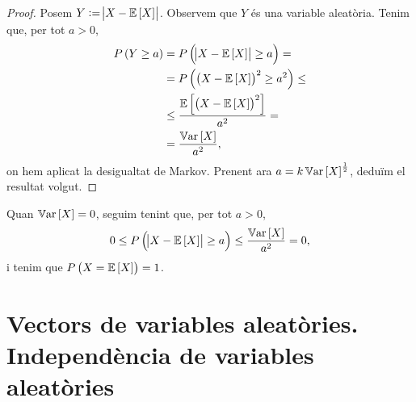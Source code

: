 \begin{proof}
    Posem $Y:=\abs{X-\operatorname{\mathbb{E}}\left[ X\right]}$. Observem que $Y$ és una variable aleatòria. Tenim que, per tot $a>0$,
    \begin{align*}
        P\left( Y\geq a\right) &= P\left(\abs{X-\operatorname{\mathbb{E}}\left[ X\right]}\geq a\right) = \\
        &= P\left(\left( X-\operatorname{\mathbb{E}}\left[ X\right]\right)^2\geq a^2\right) \leq\\
        &\leq \frac{\operatorname{\mathbb{E}}\left[ \left( X-\operatorname{\mathbb{E}}\left[ X\right]\right)^2\right]}{a^2} =\\
        &=\frac{\operatorname{\mathbb{V}ar}\left[ X\right]}{a^2},
    \end{align*}
    on hem aplicat la desigualtat de Markov. Prenent ara $a=k\operatorname{\mathbb{V}ar}\left[ X\right]^{\frac{1}{2}}$, deduïm el resultat volgut.
\end{proof}
\begin{obs}
    Quan $\operatorname{\mathbb{V}ar}\left[ X\right]=0$, seguim tenint que, per tot $a>0$,
    \[
        0\leq P\left(\abs{X-\operatorname{\mathbb{E}}\left[ X\right]} \geq a\right)\leq \frac{\operatorname{\mathbb{V}ar}\left[ X\right]}{a^2} =0,
    \]
    i tenim que $P\left( X=\operatorname{\mathbb{E}}\left[ X\right]\right)=1$.
\end{obs}

\section[Vectors de variables aleatòries. Independència de variables aleatòries]
    {Vectors de variables aleatòries. Independència de variables aleatòries
    }

